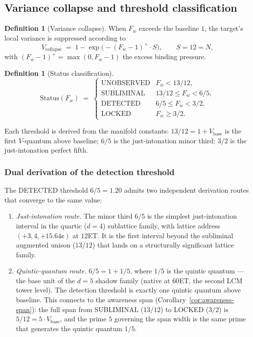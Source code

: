 \documentclass[11pt,a4paper]{article}
\theoremstyle{definition}
\newtheorem{definition}[theorem]{Definition}
\theoremstyle{remark}
\begin{document}
\subsection{Variance collapse and threshold classification}

\begin{definition}[Variance collapse]\label{def:v-collapse}
When $F_{w}$ exceeds the baseline $1$, the target's local variance is suppressed according to
\[
V_{\mathrm{collapse}} \;=\; 1 - \exp\!\bigl(-(F_{w}-1)^{+}\cdot S\bigr), \qquad S=12 = N,
\]
with $(F_{w}-1)^{+} = \max(0, F_{w}-1)$ the excess binding pressure.
\end{definition}

\begin{definition}[Status classification]\label{def:status}
\[
\mathrm{Status}(F_{w}) \;=\; \begin{cases}\text{UNOBSERVED} & F_{w} < 13/12,\\ \text{SUBLIMINAL} & 13/12 \le F_{w} < 6/5,\\ \text{DETECTED} & 6/5 \le F_{w} < 3/2,\\ \text{LOCKED} & F_{w} \ge 3/2.\end{cases}
\]
\end{definition}

Each threshold is derived from the manifold constants: $13/12 = 1 + V_{\mathrm{base}}$ is the first $V$-quantum above baseline; $6/5$ is the just-intonation minor third; $3/2$ is the just-intonation perfect fifth.

\subsubsection{Dual derivation of the detection threshold}\label{subsubsec:dual-detection}

The DETECTED threshold $6/5 = 1.20$ admits two independent derivation routes that converge to the same value:

\begin{enumerate}[label=(\roman*),leftmargin=*]
\item \emph{Just-intonation route.} The minor third $6/5$ is the simplest just-intonation interval in the quartic ($d = 4$) sublattice family, with lattice address $(+3, 4, +15.64\text{¢})$ at $12$ET. It is the first interval beyond the subliminal augmented unison ($13/12$) that lands on a structurally significant lattice family.

\item \emph{Quintic-quantum route.} $6/5 = 1 + 1/5$, where $1/5$ is the quintic quantum --- the base unit of the $d = 5$ shadow family (native at $60$ET, the second LCM tower level). The detection threshold is exactly one quintic quantum above baseline. This connects to the awareness span (Corollary~\ref{cor:awareness-span}): the full span from SUBLIMINAL ($13/12$) to LOCKED ($3/2$) is $5/12 = 5 \cdot V_{\mathrm{base}}$, and the prime $5$ governing the span width is the same prime that generates the quintic quantum $1/5$.
\end{enumerate}
\end{document}

